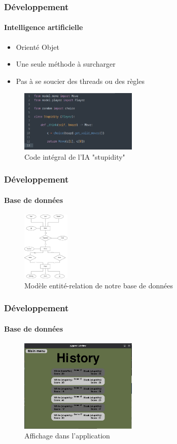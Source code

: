 \begin{frame}
	\frametitle{Développement}
	\framesubtitle{Intelligence artificielle}

	\begin{itemize}
		\item Orienté Objet
		\item Une seule méthode à surcharger
		\item Pas à se soucier des threads ou des règles
	\end{itemize}

	\begin{figure}[b]
		\includegraphics[width=0.5\textwidth]{img/stupidity.png}
		\caption{Code intégral de l'IA "stupidity"}
	\end{figure}
\end{frame}

\begin{frame}
	\frametitle{Développement}
	\framesubtitle{Base de données}

	\begin{figure}
		\includegraphics[width=0.2\textwidth]{img/entity_relationship.png}
		\caption{Modèle entité-relation de notre base de données}
	\end{figure}
\end{frame}

\begin{frame}
	\frametitle{Développement}
	\framesubtitle{Base de données}
	\begin{figure}
		\includegraphics[width=0.5\textwidth]{img/history.png}
		\caption{Affichage dans l'application}
	\end{figure}
\end{frame}


